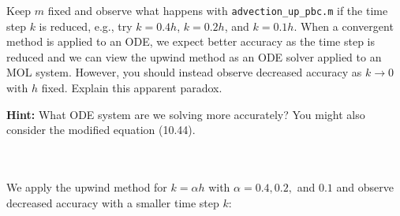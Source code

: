 Keep $m$ fixed and observe what happens with \texttt{advection\_up\_pbc.m} if the time step $k$ is reduced, e.g., try
$k = 0.4h$, $k = 0.2h$, and $k = 0.1h$. When a convergent method is applied to an ODE, we expect better accuracy as the
time step is reduced and we can view the upwind method as an ODE solver applied to an MOL system. However, you should
instead observe decreased accuracy as $k \to 0$ with $h$ fixed. Explain this apparent paradox.

\textbf{Hint:} What ODE system are we solving more accurately? You might also consider the modified equation (10.44).

\begin{solution}\ \\\\
    We apply the upwind method for $k = \alpha h$ with $\alpha = 0.4, 0.2,$ and $0.1$ and observe decreased accuracy
    with a smaller time step $k$: \ \\\\


\end{solution}
